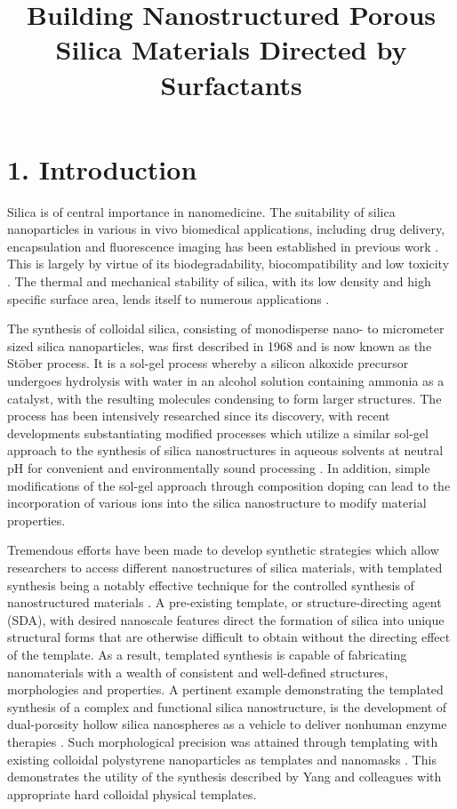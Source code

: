 \documentclass[a4paper,12pt,twocolumn]{article}
\date{}
\title{Building Nanostructured Porous Silica Materials Directed by Surfactants} %
\begin{document}

	\section{1. Introduction}
	Silica is of central importance in nanomedicine. The suitability of silica nanoparticles in various in vivo biomedical applications, including drug delivery, encapsulation \cite{slowing2008} and fluorescence imaging \cite{ow2005} has been established in previous work \cite{liberman2014}. This is largely by virtue of its biodegradability, biocompatibility and low toxicity \cite{popplewell1998}. The thermal and mechanical stability of silica, with its low density and high specific surface area, lends itself to numerous applications \cite{xu2006}.
	
The synthesis of colloidal silica, consisting of monodisperse nano- to micrometer sized silica nanoparticles, was first described in 1968 \cite{stober1968} and is now known as the St\"ober process. It is a sol-gel process whereby a silicon alkoxide precursor undergoes hydrolysis with water in an alcohol solution containing ammonia as a catalyst, with the resulting molecules condensing to form larger structures. The process has been intensively researched since its discovery, with recent developments substantiating modified processes which utilize a similar sol-gel approach to the synthesis of silica nanostructures in aqueous solvents at neutral pH for convenient and environmentally sound processing \cite{yang2008}. In addition, simple modifications of the sol-gel approach through composition doping can lead to the incorporation of various ions into the silica nanostructure \cite{pohaku2012} to modify material properties.

Tremendous efforts have been made to develop synthetic strategies which allow researchers to access different nanostructures of silica materials, with templated synthesis being a notably effective technique for the controlled synthesis of nanostructured materials \cite{liu2013}. A pre-existing template, or structure-directing agent (SDA), with desired nanoscale features direct the formation of silica into unique structural forms that are otherwise difficult to obtain without the directing effect of the template. As a result, templated synthesis is capable of fabricating nanomaterials with a wealth of consistent and well-defined structures, morphologies and properties. A pertinent example demonstrating the templated synthesis of a complex and functional silica nanostructure, is the development of dual-porosity hollow silica nanospheres as a vehicle to deliver nonhuman enzyme therapies \cite{ortac2014}. Such morphological precision was attained through templating with existing colloidal polystyrene nanoparticles as templates and nanomasks \cite{trogler2013}. This demonstrates the utility of the synthesis described by Yang and colleagues with appropriate hard colloidal physical templates.
\end{document}
